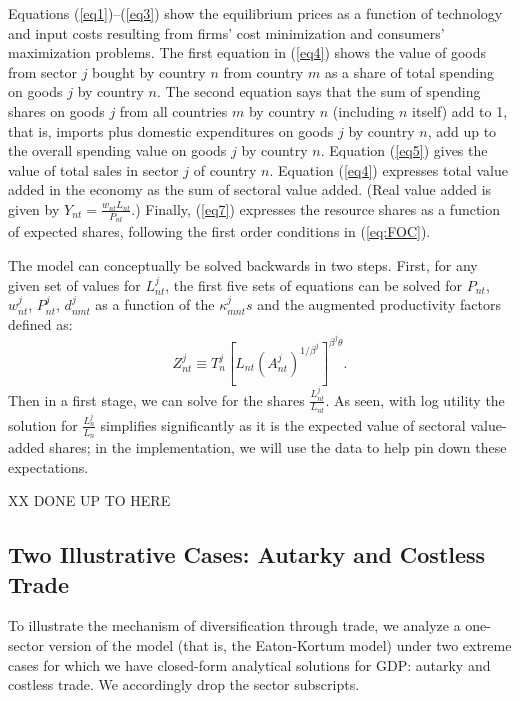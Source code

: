 \documentclass[12pt]{article}
\begin{document}
Equations (\ref{eq1})--(\ref{eq3}) show the equilibrium prices as a function
of technology and input costs resulting from firms' cost minimization and
consumers' maximization problems. The first equation in (\ref{eq4}) shows
the value of goods from sector $j$ bought by country $n$ from country $m$ as
a share of total spending on goods $j$ by country $n.$ The second equation
says that the sum of spending shares on goods $j$ from all countries $m$ by
country $n$ (including $n$ itself) add to 1, that is, imports plus domestic
expenditures on goods $j$ by country $n$, add up to the overall spending
value on goods $j$ by country $n.$ Equation (\ref{eq5}) gives the value of
total sales in sector $j$ of country $n$. Equation (\ref{eq4})
expresses total value added in the economy as the sum of sectoral value
added. (Real value added is given by $Y_{nt}=\frac{w_{nt}L_{nt}}{P_{nt}}$.)
Finally, (\ref{eq7}) expresses the resource shares as a function of expected
shares, following the first order conditions in (\ref{eq:FOC}).

The model can conceptually be solved backwards in two steps. First, for any
given set of values for $L_{nt}^{j}$, the first five sets of equations can
be solved for $P_{nt}$, $w_{nt}^{j}$, $P_{nt}^{j}$, $d_{nmt}^{j}$ as a
function of the $\kappa _{mnt}^{j}s$ and the augmented productivity factors
defined as: 
\begin{equation}
Z_{nt}^{j}\equiv T_{n}^{j}\left[ L_{nt}\left( A_{nt}^{j}\right) ^{1/\beta
^{j}}\right] ^{\beta ^{j}\theta }.  \label{productivityfactor}
\end{equation}%
Then in a first stage, we can solve for the shares $\frac{L_{nt}^{j}}{L_{nt}}
$. As seen, with log utility the solution for $\frac{L_{n}^{j}}{L_{n}}$
simplifies significantly as it is the expected value of sectoral value-added
shares; in the implementation, we will use the data to help pin down these
expectations.

XX DONE UP TO HERE

\subsection{Two Illustrative Cases: Autarky and Costless Trade}

To illustrate the mechanism of diversification through trade, we analyze a
one-sector version of the model (that is, the Eaton-Kortum model) under two
extreme cases for which we have closed-form analytical solutions for GDP:
autarky and costless trade. We accordingly drop the sector subscripts.
\end{document}
